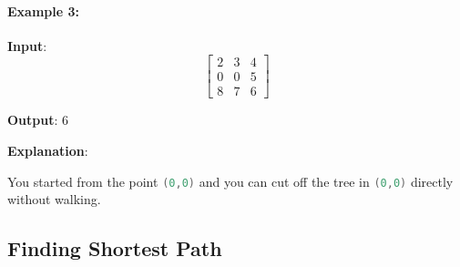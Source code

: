 \paragraph{Example 3:}
\begin{flushleft}


\textbf{Input}: 
\[
\begin{bmatrix}
2 & 3 & 4\\
0 & 0 & 5\\
8 & 7 & 6
\end{bmatrix}
\]

\textbf{Output}: 6

\textbf{Explanation}: 

You started from the point \lstinline[language=Java, basicstyle=\small\ttfamily, keywordstyle=\bfseries\color{green!40!black}]|(0,0)| and you can cut off the tree in \lstinline[language=Java, basicstyle=\small\ttfamily, keywordstyle=\bfseries\color{green!40!black}]|(0,0)| directly without walking.
\end{flushleft}

\subsection{Finding Shortest Path}
